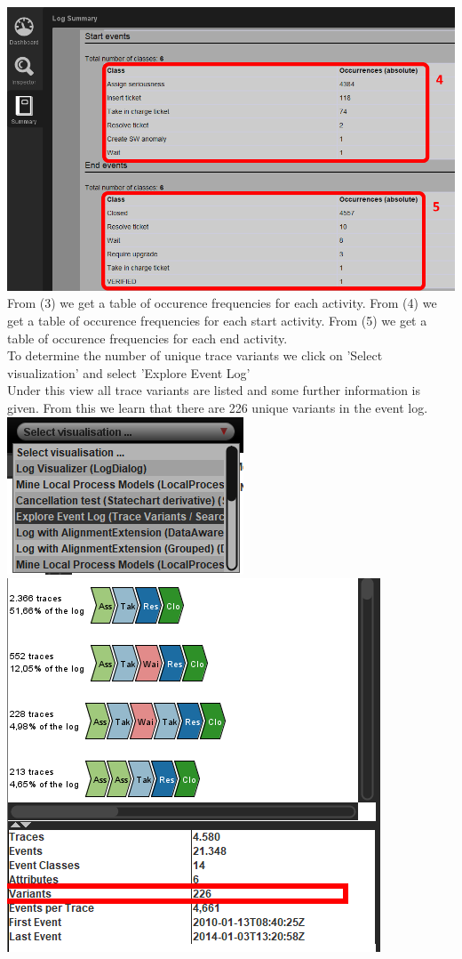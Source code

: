 \documentclass[../../main.tex]{subfiles}
\begin{document}
\includegraphics[width=0.8\columnwidth]{img/ProM_a_summary_2.png}\\
From (3) we get a table of occurence frequencies for each activity. From (4) we get a table of occurence frequencies for each start activity. From (5) we get a table of occurence frequencies for each end activity.\\
To determine the number of unique trace variants we click on 'Select visualization' and select 'Explore Event Log'\\
Under this view all trace variants are listed and some further information is given. From this we learn that there are 226 unique variants in the event log.\\
\includegraphics[width=0.5\columnwidth]{img/ProM_a_setting.png}\includegraphics[width=0.5\columnwidth]{img/ProM_a_traces.png}\\
\end{document}
